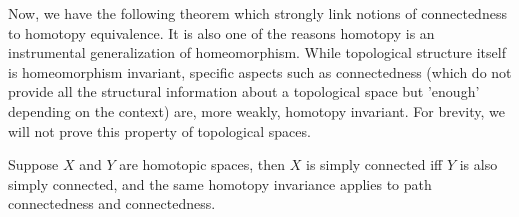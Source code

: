 \documentclass[oneside]{book}
\begin{document}
Now, we have the following theorem which strongly link notions of connectedness to homotopy equivalence. It is also one of the reasons homotopy is an instrumental generalization of homeomorphism. While topological structure itself is homeomorphism invariant, specific aspects such as connectedness (which do not provide all the structural information about a topological space but 'enough' depending on the context) are, more weakly, homotopy invariant. For brevity, we will not prove this property of topological spaces.

{
Suppose $X$ and $Y$ are homotopic spaces, then $X$ is simply connected iff $Y$ is also simply connected, and the same homotopy invariance applies to path connectedness and connectedness.
}

\label{contractible_implies_simply_connected}
\end{document}
